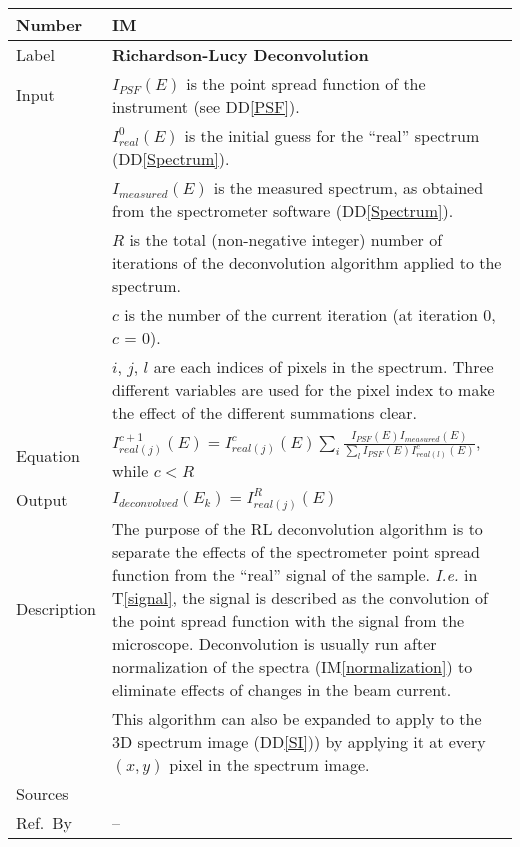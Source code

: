 \documentclass[12pt]{article}
\newcommand{\colAwidth}{0.13\textwidth}
\newcommand{\colBwidth}{0.82\textwidth}
\newcommand{\ddref}[1]{DD\ref{#1}}
\newcommand{\tref}[1]{T\ref{#1}}
\newcounter{instnum} %
\newcommand{\iref}[1]{IM\ref{#1}}
\begin{document}
~\newline


\noindent
\begin{minipage}{\textwidth}
	\renewcommand*{\arraystretch}{1.5}
	\begin{tabular}{| p{\colAwidth} | p{\colBwidth}|}
		\hline
		\rowcolor[gray]{0.9}
		Number & IM{instnum}\theinstnum \label{deconvolution}\\
		\hline
		Label & \bf Richardson-Lucy Deconvolution\\
		\hline
		Input& $I_{PSF}(E)$ is the point spread function of the instrument (see
\ddref{PSF}).\\
		& $I_{real}^0(E)$ is the initial guess for the ``real'' spectrum
(\ddref{Spectrum}).\\
		& $I_{measured}(E)$ is the measured spectrum, as obtained from the
spectrometer software (\ddref{Spectrum}).\\
		& $R$ is the total (non-negative integer) number of iterations of the
deconvolution algorithm applied to the spectrum. \\
		& $c$ is the number of the current iteration (at iteration 0, $c$ = 0).\\
		& $i$, $j$, $l$ are each indices of pixels in the spectrum. Three different
variables are used for the pixel index to make the effect of the different
summations clear.\\
		\hline
		Equation & $I_{real (j)}^{c+1}(E)=I_{real
(j)}^c(E)\sum_i{\frac{I_{PSF}(E)I_{measured}(E)}{\sum_l{I_{PSF}(E)I_{real
(l)}^c(E)}}}$, while $c < R$\\
		\hline
		Output& $I_{deconvolved}(E_k)=I_{real (j)}^{R}(E)$\\
		\hline
		Description & The purpose of the RL deconvolution algorithm is to separate the
effects of the spectrometer point spread function from the ``real'' signal of
the sample. \textit{I.e.} in \tref{signal}, the signal is described as the
convolution of the point spread function with the signal from the microscope.
Deconvolution is usually run after normalization of the spectra
(\iref{normalization}) to eliminate effects of changes in the beam current.\\
		& This algorithm can also  be expanded to apply to the 3D spectrum image
(\ddref{SI})) by applying it at every $(x,y)$ pixel in the spectrum image.\\
		\hline
		Sources&~\cite{gloter_improving_2003, bellido_toward_2014} \ \\
		\hline
		Ref.\ By & --\\
		\hline
	\end{tabular}
\end{minipage}\\
\end{document}
